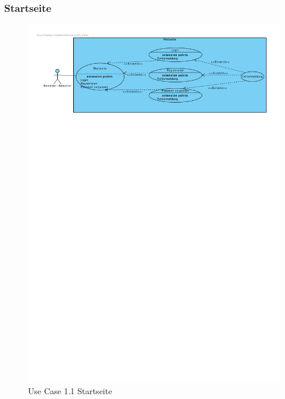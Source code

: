 \documentclass[10pt,a4paper]{article}
\begin{document}
\subsubsection{Startseite}
	\begin{figure}[h!]
	  \includegraphics[width=\linewidth]{gfx/webseite/startseite.pdf}
          \caption{Use Case 1.1 Startseite}
	\end{figure}
\end{document}

